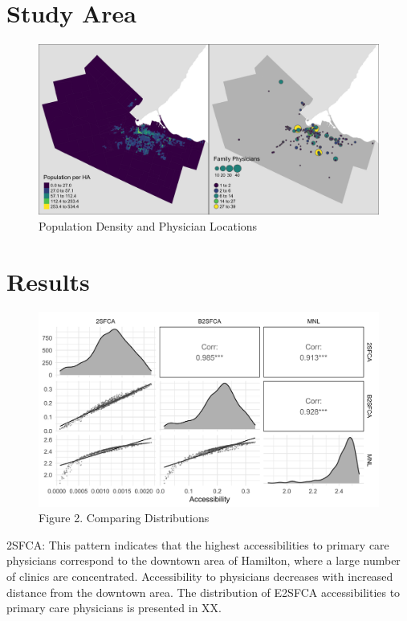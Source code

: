 \documentclass{article}
\begin{document}
\hypertarget{study-area}{%
\section{Study Area}\label{study-area}}

\begin{figure}
\includegraphics[width=1\linewidth]{./img/Fig_1} \caption{Population Density and Physician Locations}\label{fig:fig 1}
\end{figure}

\hypertarget{results}{%
\section{Results}\label{results}}

\begin{figure}
\includegraphics[width=1\linewidth]{./img/Fig_2} \caption{Figure 2. Comparing Distributions}\label{fig:fig 2}
\end{figure}

2SFCA: This pattern indicates that the highest accessibilities to
primary care physicians correspond to the downtown area of Hamilton,
where a large number of clinics are concentrated. Accessibility to
physicians decreases with increased distance from the downtown area. The
distribution of E2SFCA accessibilities to primary care physicians is
presented in XX.
\end{document}
